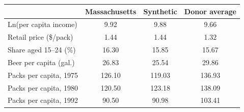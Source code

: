 \begin{tabular}{lccc}
\toprule
 & Massachusetts & Synthetic & Donor average \\
\midrule
Ln(per capita income) & 9.92 & 9.88 & 9.66 \\
Retail price (\$/pack) & 1.44 & 1.44 & 1.32 \\
Share aged 15--24 (\%) & 16.30 & 15.85 & 15.67 \\
Beer per capita (gal.) & 26.83 & 25.54 & 29.86 \\
Packs per capita, 1975 & 126.10 & 119.03 & 136.93 \\
Packs per capita, 1980 & 120.50 & 123.18 & 138.09 \\
Packs per capita, 1992 & 90.50 & 90.98 & 103.41 \\
\bottomrule
\end{tabular}

